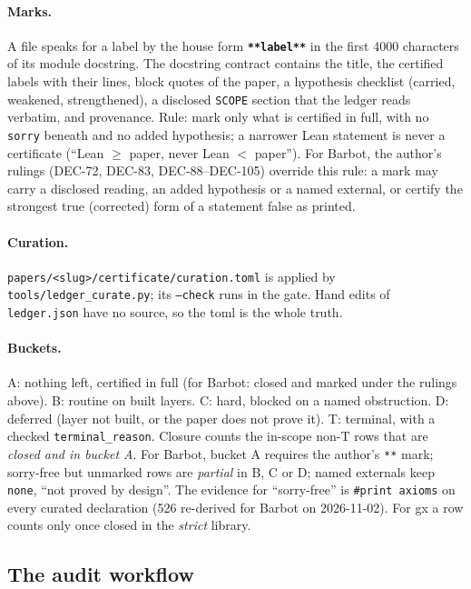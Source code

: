 \documentclass[11pt,a4paper]{article}
\newcommand{\dec}[1]{DEC-#1}
\theoremstyle{plain}
\theoremstyle{definition}
\theoremstyle{remark}
\begin{document}
\paragraph{Marks.} A file speaks for a label by the house form \textbf{\texttt{**label**}}
in the first 4000 characters of its module docstring. The docstring contract contains the
title, the certified labels with their lines, block quotes of the paper, a hypothesis
checklist (carried, weakened, strengthened), a disclosed \texttt{SCOPE} section that the
ledger reads verbatim, and provenance. Rule: mark only what is certified in full, with no
\texttt{sorry} beneath and no added hypothesis; a narrower Lean statement is never a
certificate (``Lean $\ge$ paper, never Lean $<$ paper''). For Barbot, the author's rulings
(\dec{72}, \dec{83}, \dec{88}--\dec{105}) override this rule: a mark may carry a disclosed
reading, an added hypothesis or a named external, or certify the strongest true (corrected)
form of a statement false as printed.

\paragraph{Curation.} \texttt{papers/<slug>/certificate/curation.toml} is applied by
\texttt{tools/ledger\_curate.py}; its \texttt{--check} runs in the gate. Hand edits of
\texttt{ledger.json} have no source, so the toml is the whole truth.

\paragraph{Buckets.} A: nothing left, certified in full (for Barbot: closed and marked
under the rulings above). B: routine on built layers.
C: hard, blocked on a named obstruction. D: deferred (layer not built, or the paper does
not prove it). T: terminal, with a checked \texttt{terminal\_reason}. Closure counts the
in-scope non-T rows that are \emph{closed and in bucket A}. For Barbot, bucket A requires
the author's \texttt{**} mark; sorry-free but unmarked rows are \emph{partial} in B, C or D;
named externals keep \texttt{none}, ``not proved by design''. The evidence for
``sorry-free'' is \texttt{\#print axioms} on every curated declaration (526 re-derived for
Barbot on 2026-11-02). For gx a row counts only once closed in the \emph{strict} library.

\subsection{The audit workflow}
\end{document}

